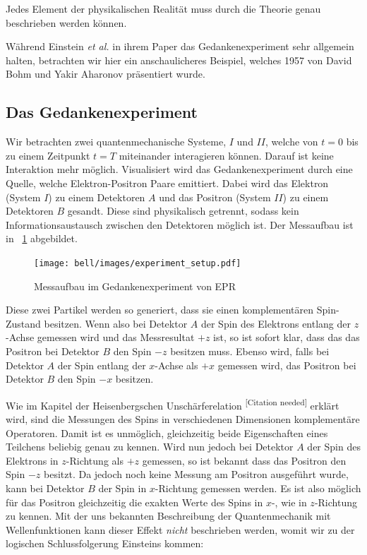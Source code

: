 \begin{refsection}
\begin{definition}\label{def:Bell:Vollstaendigkeit}
    Jedes Element der physikalischen Realit\"at muss durch die Theorie
    genau beschrieben werden k\"onnen.
\end{definition}

W\"ahrend Einstein \emph{et al.} in ihrem Paper das Gedankenexperiment sehr
allgemein halten, betrachten wir hier ein anschaulicheres Beispiel, welches
1957 von David Bohm und Yakir Aharonov \cite{Bell:Bohm1957} pr\"asentiert wurde.

\subsection{Das Gedankenexperiment\label{subsection:bell:epr:idee}}
Wir betrachten zwei quantenmechanische Systeme, $I$ und $II$,
welche von $t=0$ bis zu einem Zeitpunkt $t=T$ miteinander 
interagieren k\"onnen. Darauf ist keine Interaktion mehr m\"oglich.
Visualisiert wird das Gedankenexperiment durch eine Quelle, welche
Elektron-Positron Paare emittiert. 
Dabei wird das Elektron (System $I$) zu einem Detektoren $A$ und das 
Positron (System $II$) zu einem Detektoren $B$ gesandt.
Diese sind physikalisch getrennt, sodass kein Informationsaustausch
zwischen den Detektoren m\"oglich ist.
Der Messaufbau ist in \figurename~\ref{fig:bell:EPR_Messaufbau} abgebildet.

\begin{figure}
    \centering
    \texttt{[image: bell/images/experiment\_setup.pdf]}
    \caption{Messaufbau im Gedankenexperiment von EPR}
    \label{fig:bell:EPR_Messaufbau}
\end{figure}

Diese zwei Partikel werden so generiert, dass sie einen komplement\"aren
Spin-Zustand besitzen. 
Wenn also bei Detektor $A$ der Spin des Elektrons entlang der $z$-Achse
gemessen wird und das Messresultat $+z$ ist, so ist sofort klar, dass
das das Positron bei Detektor $B$ den Spin $-z$ besitzen muss. 
Ebenso wird, falls bei Detektor $A$ der Spin entlang der $x$-Achse als $+x$
gemessen wird, das Positron bei Detektor $B$ den Spin $-x$ besitzen.

Wie im Kapitel der Heisenbergschen Unsch\"arferelation
\textsuperscript{[Citation needed]}
erkl\"art wird, sind die Messungen des Spins in verschiedenen Dimensionen 
komplement\"are Operatoren.
Damit ist es unm\"oglich, gleichzeitig beide Eigenschaften eines Teilchens
beliebig genau zu kennen.
Wird nun jedoch bei Detektor $A$ der Spin des Elektrons in $z$-Richtung 
als $+z$ gemessen, so ist bekannt dass das Positron den Spin $-z$ besitzt.
Da jedoch noch keine Messung am Positron ausgef\"uhrt wurde, kann bei
Detektor $B$ der Spin in $x$-Richtung gemessen werden.
Es ist also m\"oglich f\"ur das Positron gleichzeitig die exakten Werte 
des Spins in $x$-, wie in $z$-Richtung zu kennen. 
Mit der uns bekannten Beschreibung der Quantenmechanik mit Wellenfunktionen
kann dieser Effekt \emph{nicht} beschrieben werden, womit wir zu der
logischen Schlussfolgerung Einsteins kommen:


\end{refsection}
